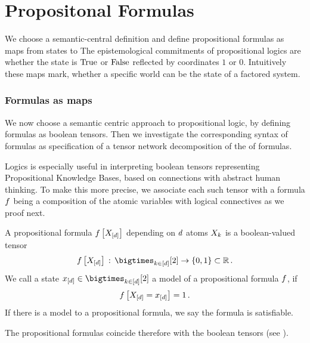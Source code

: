 \section{Propositonal Formulas}

We choose a semantic-central definition and define propositional formulas as maps from states to
The epistemological commitments of propositional logics are whether the state is $\mathrm{True}$ or $\mathrm{False}$ reflected by coordinates $1$ or $0$.
Intuitively these maps mark, whether a specific world can be the state of a factored system.

\subsubsection{Formulas as maps}

We now choose a semantic centric approach to propositional logic, by defining formulas as boolean tensors.
Then we investigate the corresponding syntax of formulas as specification of a tensor network decomposition of the \basisEncoding{} of formulas.

Logics is especially useful in interpreting boolean tensors representing Propositional Knowledge Bases, based on connections with abstract human thinking.
To make this more precise, we associate each such tensor with a formula $f$ being a composition of the atomic variables with logical connectives as we proof next.

\begin{definition}
    \label{def:formulas}
    A propositional formula $f\left[X_{[d]}\right]$ depending on $d$ atoms $X_{k}$ is a boolean-valued tensor
    \begin{align*}
        \formulaat{\shortcatvariables} \defcols \atomstates \rightarrow \ozset \subset \rr \, .
    \end{align*}
    We call a state $\shortcatindices \in \atomstates$ a model of a propositional formula $f$, if
    \begin{align*}
        f\left[X_{[d]}=x_{[d]}\right]=1 \, .
    \end{align*}
    If there is a model to a propositional formula, we say the formula is satisfiable.
\end{definition}

The propositional formulas coincide therefore with the boolean tensors (see ).


